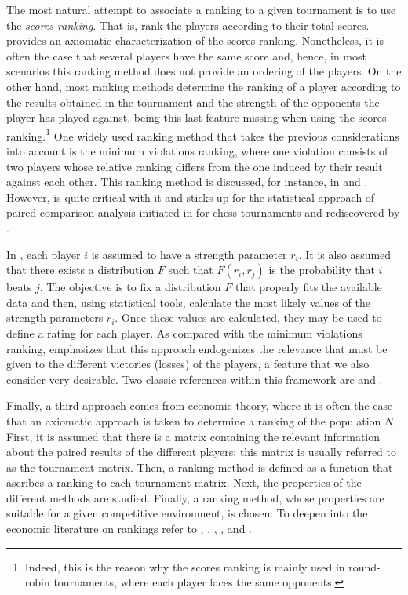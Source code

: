 \documentclass[a4paper,10pt]{article}
\theoremstyle{remark}
\newcommand{\rv}{r} %
\begin{document}
The most natural attempt to associate a ranking to a given
tournament is to use the \emph{scores ranking}. That is, rank the
players according to their total scores. \cite{Rubinstein:1980}
provides an axiomatic characterization of the scores ranking.
Nonetheless, it is often the case that several players have the
same score and, hence, in most scenarios this ranking method does
not provide an ordering of the players. On the other hand, most
ranking methods determine the ranking of a player according to the
results obtained in the tournament and the strength of the
opponents the player has played against, being this last feature
missing when using the scores ranking.\footnote{Indeed, this is
the reason why the scores ranking is mainly used in round-robin
tournaments, where each player faces the same opponents.} One
widely used ranking method that takes the previous considerations
into account is the {minimum violations ranking}, where one
violation consists of two players whose relative ranking differs
from the one induced by their result against each other. This
ranking method is discussed, for instance, in \cite{Goddard:1983}
and \cite{Iqbal:1986}. However, \cite{Stob:1985} is quite critical
with it and sticks up for the statistical approach of paired
comparison analysis initiated in \cite{Zermelo:1929} for chess
tournaments and rediscovered by \cite{Bradley:1952}.

In \cite{Bradley:1952}, each player $i$ is assumed to have a
strength parameter $\rv_i$. It is also assumed that there exists a
distribution $F$ such that $F(\rv_i,\rv_j)$ is the probability
that $i$ beats $j$. The objective is to fix a distribution $F$
that properly fits the available data and then, using statistical
tools, calculate the most likely values of the strength parameters
$\rv_i$. Once these values are calculated, they may be used to
define a rating for each player. As compared with the minimum
violations ranking, \cite{Stob:1985} emphasizes that this approach endogenizes
the relevance that must be given to the different victories
(losses) of the players, a feature that we also consider very
desirable. Two classic references within this framework are
\cite{Kendall:1940} and \cite{David:1988}.

Finally, a third approach comes from economic theory, where it is
often the case that an axiomatic approach is taken to determine a
ranking of the population $N$. First, it is assumed that there is
a matrix containing the relevant information about the paired
results of the different players; this matrix is usually referred
to as the tournament matrix. Then, a ranking method is defined as
a function that ascribes a ranking to each tournament matrix.
Next, the properties of the different methods are studied.
Finally, a ranking method, whose properties are suitable for a
given competitive environment, is chosen. To deepen into the
economic literature on rankings refer to \cite{Rubinstein:1980},
\cite{Liebowitz:1984}, \cite{Amir:2002}, \cite{Volij:2004}, and
\cite{Volij:2005}.
\end{document}
